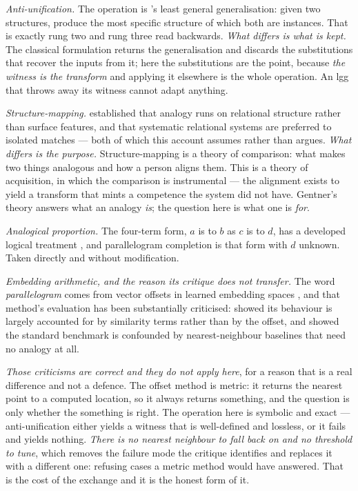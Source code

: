\documentclass[11pt,a4paper]{article}
\theoremstyle{remark}
\begin{document}
\emph{Anti-unification.} The operation is \citet{plotkin1970}'s least general generalisation: given two
structures, produce the most specific structure of which both are instances. That is exactly rung two
and rung three read backwards. \emph{What differs is what is kept.} The classical formulation returns
the generalisation and discards the substitutions that recover the inputs from it; here the
substitutions are the point, because \emph{the witness is the transform} and applying it elsewhere is
the whole operation. An lgg that throws away its witness cannot adapt anything.

\emph{Structure-mapping.} \citet{gentner1983} established that analogy runs on relational structure
rather than surface features, and that systematic relational systems are preferred to isolated matches
--- both of which this account assumes rather than argues. \emph{What differs is the purpose.}
Structure-mapping is a theory of comparison: what makes two things analogous and how a person aligns
them. This is a theory of acquisition, in which the comparison is instrumental --- the alignment exists
to yield a transform that mints a competence the system did not have. Gentner's theory answers what an
analogy \emph{is}; the question here is what one is \emph{for}.

\emph{Analogical proportion.} The four-term form, $a$ is to $b$ as $c$ is to $d$, has a developed logical
treatment \citep{prade2014}, and parallelogram completion is that form with $d$ unknown. Taken directly
and without modification.

\emph{Embedding arithmetic, and the reason its critique does not transfer.} The word
\emph{parallelogram} comes from vector offsets in learned embedding spaces \citep{mikolov2013}, and that
method's evaluation has been substantially criticised: \citet{levy2014} showed its behaviour is largely
accounted for by similarity terms rather than by the offset, and \citet{linzen2016} showed the standard
benchmark is confounded by nearest-neighbour baselines that need no analogy at all.

\emph{Those criticisms are correct and they do not apply here}, for a reason that is a real difference
and not a defence. The offset method is metric: it returns the nearest point to a computed location, so
it always returns something, and the question is only whether the something is right. The operation
here is symbolic and exact --- anti-unification either yields a witness that is well-defined and
lossless, or it fails and yields nothing. \emph{There is no nearest neighbour to fall back on and no
threshold to tune}, which removes the failure mode the critique identifies and replaces it with a
different one: refusing cases a metric method would have answered. That is the cost of the exchange and
it is the honest form of it.
\end{document}
